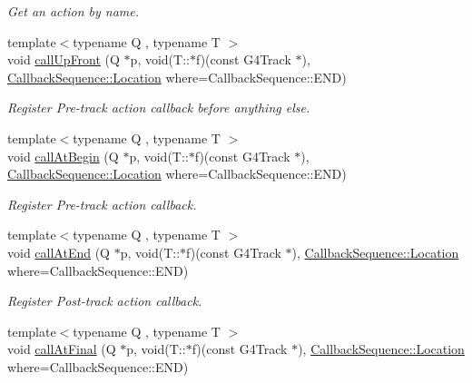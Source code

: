 \begin{DoxyCompactItemize}
\begin{DoxyCompactList}\small\item\em Get an action by name. \item\end{DoxyCompactList}\item 
{\footnotesize template$<$typename Q , typename T $>$ }\\void \hyperlink{class_d_d4hep_1_1_simulation_1_1_geant4_tracking_action_sequence_a1da92534c2f0bdbfc917f4549ddcb154}{callUpFront} (Q $\ast$p, void(T::$\ast$f)(const G4Track $\ast$), \hyperlink{struct_d_d4hep_1_1_callback_sequence_a7753490247479633aed16a2376821ef7}{CallbackSequence::Location} where=CallbackSequence::END)
\begin{DoxyCompactList}\small\item\em Register Pre-\/track action callback before anything else. \item\end{DoxyCompactList}\item 
{\footnotesize template$<$typename Q , typename T $>$ }\\void \hyperlink{class_d_d4hep_1_1_simulation_1_1_geant4_tracking_action_sequence_a4e933ed9417657635b11034a9b7fa435}{callAtBegin} (Q $\ast$p, void(T::$\ast$f)(const G4Track $\ast$), \hyperlink{struct_d_d4hep_1_1_callback_sequence_a7753490247479633aed16a2376821ef7}{CallbackSequence::Location} where=CallbackSequence::END)
\begin{DoxyCompactList}\small\item\em Register Pre-\/track action callback. \item\end{DoxyCompactList}\item 
{\footnotesize template$<$typename Q , typename T $>$ }\\void \hyperlink{class_d_d4hep_1_1_simulation_1_1_geant4_tracking_action_sequence_ab9c75782af8475ae3fa3148229cafb9d}{callAtEnd} (Q $\ast$p, void(T::$\ast$f)(const G4Track $\ast$), \hyperlink{struct_d_d4hep_1_1_callback_sequence_a7753490247479633aed16a2376821ef7}{CallbackSequence::Location} where=CallbackSequence::END)
\begin{DoxyCompactList}\small\item\em Register Post-\/track action callback. \item\end{DoxyCompactList}\item 
{\footnotesize template$<$typename Q , typename T $>$ }\\void \hyperlink{class_d_d4hep_1_1_simulation_1_1_geant4_tracking_action_sequence_af6fafbf683753a13464ef9def5579644}{callAtFinal} (Q $\ast$p, void(T::$\ast$f)(const G4Track $\ast$), \hyperlink{struct_d_d4hep_1_1_callback_sequence_a7753490247479633aed16a2376821ef7}{CallbackSequence::Location} where=CallbackSequence::END)

\end{DoxyCompactItemize}
